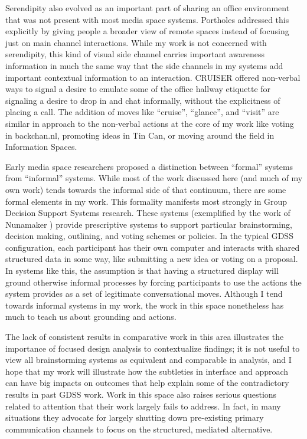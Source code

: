 \documentclass{tufte-handout}
\begin{document}


Serendipity also evolved as an important part of sharing an office environment that was not present with most media space systems. Portholes \citep{Dourish:1992fu} addressed this explicitly by giving people a broader view of remote spaces instead of focusing just on main channel interactions. While my work is not concerned with serendipity, this kind of visual side channel carries important awareness information in much the same way that the side channels in my systems add important contextual information to an interaction. CRUISER \citep{Fish:1992vz} offered non-verbal ways to signal a desire to emulate some of the office hallway etiquette for signaling a desire to drop in and chat informally, without the explicitness of placing a call. The addition of moves like ``cruise'', ``glance'', and ``visit'' are similar in approach to the non-verbal actions at the core of my work like voting in backchan.nl, promoting ideas in Tin Can, or moving around the field in Information Spaces. 

Early media space researchers proposed a distinction between ``formal'' systems from ``informal'' systems. \citep{Olson:1991vz} While most of the work discussed here (and much of my own work) tends towards the informal side of that continuum, there are some formal elements in my work. This formality manifests most strongly in Group Decision Support Systems research. These systems (exemplified by the work of Nunamaker \citep{nunamaker_electronic_1991}) provide prescriptive systems to support particular brainstorming, decision making, outlining, and voting schemes or policies. In the typical GDSS configuration, each participant has their own computer and interacts with shared structured data in some way, like submitting a new idea or voting on a proposal. In systems like this, the assumption is that having a structured display will ground otherwise informal processes by forcing participants to use the actions the system provides as a set of legitimate conversational moves. Although I tend towards informal systems in my work, the work in this space nonetheless has much to teach us about grounding and actions. 

The lack of consistent results in comparative work in this area \citep{Dennis:1988ww} illustrates the importance of focused design analysis to contextualize findings; it is not useful to view all brainstorming systems as equivalent and comparable in analysis, and I hope that my work will illustrate how the subtleties in interface and approach can have big impacts on outcomes that help explain some of the contradictory results in past GDSS work. Work in this space also raises serious questions related to attention that their work largely fails to address. In fact, in many situations they advocate for largely shutting down pre-existing primary communication channels to focus on the structured, mediated alternative.
\end{document}
